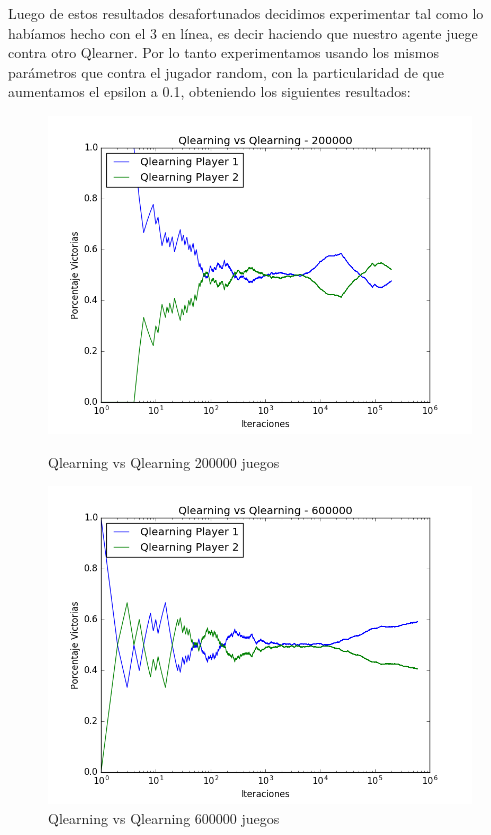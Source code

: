 Luego de estos resultados desafortunados decidimos experimentar tal como lo habíamos hecho con el 3 en línea, es decir haciendo que nuestro agente juege contra otro Qlearner. Por lo tanto
experimentamos usando los mismos parámetros que contra el jugador random, con la particularidad de que aumentamos el epsilon a 0.1, obteniendo los siguientes resultados:

\begin{figure}[H]
 \centering
 \begin{minipage}{.45\textwidth}
	\centering
	\includegraphics[scale=0.35]{resultados/7x6/QlearningVsQlearning_200000_7x6_parametros_informe.png}
       \caption{Qlearning vs Qlearning 200000 juegos}
  \end{minipage}
 \begin{minipage}{.5\textwidth}
	\centering
	\includegraphics[scale=0.35]{resultados/7x6/QlearningVsQlearning_600000_7x6_parametros_informe.png}
        \caption{Qlearning vs Qlearning 600000 juegos}
  \end{minipage}
\end{figure}


